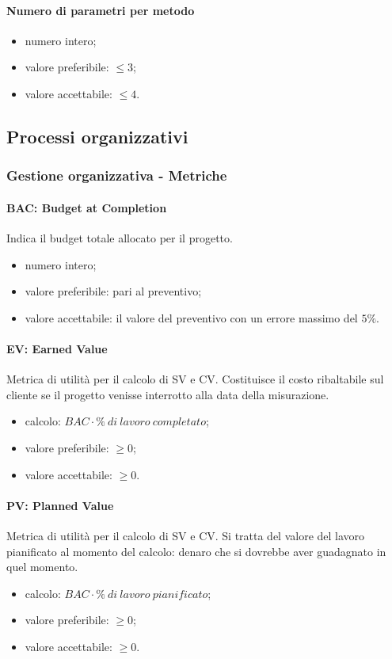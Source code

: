 		\paragraph{Numero di parametri per metodo}
		\begin{itemize}
		\item numero intero;
		\item valore preferibile: $\leq 3$;
		\item valore accettabile: $ \leq 4$.
		\end{itemize}
		
	\subsection{Processi organizzativi}
		\subsubsection{Gestione organizzativa - Metriche}
		\paragraph{BAC: Budget at Completion}
		Indica il budget totale allocato per il progetto.
		\begin{itemize}
		\item numero intero;
		\item valore preferibile: pari al preventivo;
		\item valore accettabile: il valore del preventivo con un errore massimo del $5\%$.
		\end{itemize}
		
		\paragraph{EV: Earned Value}
		Metrica di utilità per il calcolo di SV e CV. Costituisce il costo ribaltabile sul cliente se il progetto venisse interrotto alla data della misurazione.
		\begin{itemize}
		\item calcolo: $BAC \cdot \% \  di \ lavoro \ completato$;
		\item valore preferibile: $\geq 0$;
		\item valore accettabile: $\geq 0$.
		\end{itemize}
		
		\paragraph{PV: Planned Value}
		Metrica di utilità per il calcolo di SV e CV. Si tratta del valore del lavoro pianificato al momento del calcolo: denaro che si dovrebbe aver guadagnato in quel momento.
		\begin{itemize}
		\item calcolo: $BAC \cdot \% \ di \ lavoro \ pianificato$;
		\item valore preferibile: $\geq 0$;
		\item valore accettabile: $\geq 0$.
		\end{itemize}
		
